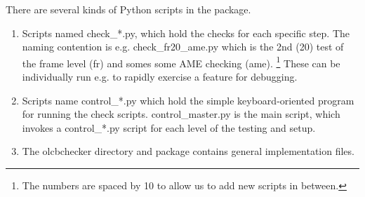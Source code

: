 There are several kinds of Python scripts in the package. 
\begin{enumerate}
\item Scripts named check\_*.py, which hold the checks for each specific step.
    The naming contention is e.g. check\_fr20\_ame.py which is the 2nd (20)
    test of the frame level (fr) and somes some AME checking (ame).
    \footnote{The numbers are spaced by 10 to allow us to add new scripts in between.}
    These can be individually run e.g. to rapidly exercise a feature for debugging.
\item Scripts name control\_*.py which hold the simple keyboard-oriented 
    program for running the check scripts.  control\_master.py is the 
    main script, which invokes a control\_*.py script for each level of the 
    testing and setup.
\item The olcbchecker directory and package contains general implementation 
    files.
\end{enumerate}



  
